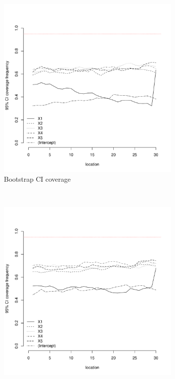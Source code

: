 \documentclass[authoryear, review, 11pt]{elsarticle}
\begin{document}
\begin{figure}
	\vspace{-30mm}
	\centering
	\begin{subfigure}[b]{0.45\textwidth}
	\centering
		\includegraphics[width=\textwidth]{../../figures/simulation/15.36.profile_bootstrap_coverage.pdf}
		\caption{Bootstrap CI coverage}
	\end{subfigure}%
	~ %
	\begin{subfigure}[b]{0.45\textwidth}
	\centering
		\includegraphics[width=\textwidth]{../../figures/simulation/15.36.profile_se_coverage.pdf}

\end{subfigure}
\end{figure}
\end{document}
